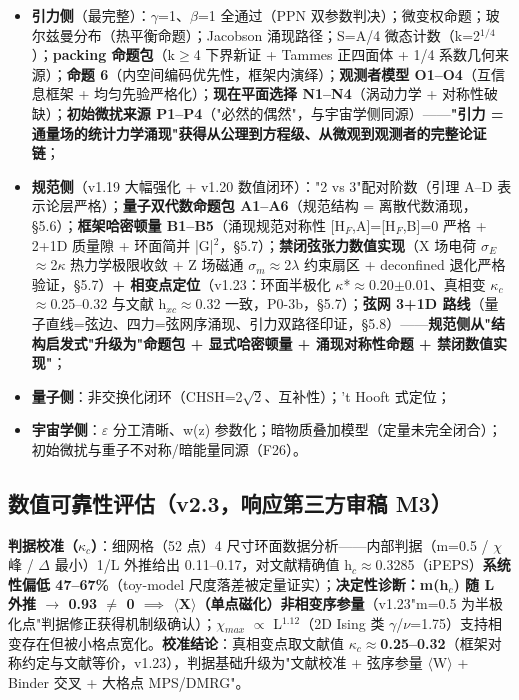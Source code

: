 \documentclass[UTF8,fontset=windows]{csoarticle}
\newcommand{\up}[1]{\ensuremath{^{#1}}}
\newcommand{\down}[1]{\ensuremath{_{#1}}}
\begin{document}
\begin{itemize}
\item \textbf{引力侧}（最完整）：\ensuremath{\gamma}=1、\ensuremath{\beta}=1 全通过（PPN 双参数判决）；微变权命题；玻尔兹曼分布（热平衡命题）；Jacobson 涌现路径；S=A/4 微态计数（k=2\up{1/4}）；\textbf{packing 命题包}（k\ensuremath{\geq}4 下界新证 + Tammes 正四面体 + 1/4 系数几何来源）；\textbf{命题 6}（内空间编码优先性，框架内演绎）；\textbf{观测者模型 O1--O4}（互信息框架 + 均匀先验严格化）；\textbf{现在平面选择 N1--N4}（涡动力学 + 对称性破缺）；\textbf{初始微扰来源 P1--P4}（"必然的偶然"，与宇宙学侧同源）------\textbf{"引力 = 通量场的统计力学涌现"获得从公理到方程级、从微观到观测者的完整论证链}；
\item \textbf{规范侧}（v1.19 大幅强化 + v1.20 数值闭环）："2 vs 3"配对阶数（引理 A--D 表示论层严格）；\textbf{量子双代数命题包 A1--A6}（规范结构 = 离散代数涌现，\S{}5.6）；\textbf{框架哈密顿量 B1--B5}（涌现规范对称性 [H\down{F},A]=[H\down{F},B]=0 严格 + 2+1D 质量隙 + 环面简并 |G|\up{2}，\S{}5.7）；\textbf{禁闭弦张力数值实现}（X 场电荷 \ensuremath{\sigma}\down{E}\ensuremath{\approx}2\ensuremath{\kappa} 热力学极限收敛 + Z 场磁通 \ensuremath{\sigma}\down{m}\ensuremath{\approx}2\ensuremath{\lambda} 约束扇区 + deconfined 退化严格验证，\S{}5.7）\textbf{+ 相变点定位}（v1.23：环面半极化 \ensuremath{\kappa}*\ensuremath{\approx}0.20\ensuremath{\pm}0.01、真相变 \ensuremath{\kappa}\down{c}\ensuremath{\approx}0.25--0.32 与文献 h\down{xc}\ensuremath{\approx}0.32 一致，P0-3b，\S{}5.7）；\textbf{弦网 3+1D 路线}（量子直线=弦边、四力=弦网序涌现、引力双路径印证，\S{}5.8）------\textbf{规范侧从"结构启发式"升级为"命题包 + 显式哈密顿量 + 涌现对称性命题 + 禁闭数值实现"}；
\item \textbf{量子侧}：非交换化闭环（CHSH=2\ensuremath{\sqrt{2}}、互补性）；'t Hooft 式定位；
\item \textbf{宇宙学侧}：\ensuremath{\varepsilon} 分工清晰、w(z) 参数化；暗物质叠加模型（定量未完全闭合）；初始微扰与重子不对称/暗能量同源（F26）。
\end{itemize}

\subsection{数值可靠性评估（v2.3，响应第三方审稿 M3）}

\textbf{判据校准（\ensuremath{\kappa}\down{c}）}：细网格（52 点）4 尺寸环面数据分析------内部判据（m=0.5 / \ensuremath{\chi} 峰 / \ensuremath{\Delta} 最小）1/L 外推给出 0.11--0.17，对文献精确值 h\down{c}\ensuremath{\approx}0.3285（iPEPS）\textbf{系统性偏低 47--67\%}（toy-model 尺度落差被定量证实）；\textbf{决定性诊断：m(h\down{c}) 随 L 外推 \ensuremath{\to} 0.93 \ensuremath{\neq} 0 \ensuremath{\implies} \ensuremath{\langle}X\ensuremath{\rangle}（单点磁化）非相变序参量}（v1.23"m=0.5 为半极化点"判据修正获得机制级确认）；\ensuremath{\chi}\down{max} \ensuremath{\propto} L\up{1.12}（2D Ising 类 \ensuremath{\gamma}/\ensuremath{\nu}=1.75）支持相变存在但被小格点宽化。\textbf{校准结论}：真相变点取文献值 \textbf{\ensuremath{\kappa}\down{c}\ensuremath{\approx}0.25--0.32}（框架对称约定与文献等价，v1.23），判据基础升级为"文献校准 + 弦序参量 \ensuremath{\langle}W\ensuremath{\rangle} + Binder 交叉 + 大格点 MPS/DMRG"。
\end{document}
